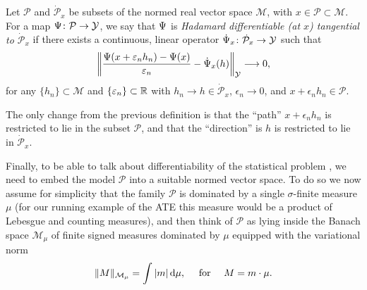 \documentclass[a4,danish]{article}
\begin{document}
\begin{definition}
  Let $\mathcal{P}$ and $\dot{\mathcal{P}}_x$ be subsets of the normed real vector space
  $\mathcal{M}$, with $x \in \mathcal{P} \subset \mathcal{M}$. For a map
  $\operatorname{\Psi} \colon \mathcal{P} \rightarrow \mathcal{Y}$, we say that $\operatorname{\Psi}$ is \textit{Hadamard
    differentiable (at $x$) tangential to $\dot{\mathcal{P}}_x$} if there exists a continuous,
  linear operator $\dot{\operatorname{\Psi}}_x \colon \dot{\mathcal{P}}_x \rightarrow \mathcal{Y}$ such that
  \begin{equation*}
    \left\Vert
      \frac{\operatorname{\Psi}(x + \varepsilon_n h_n) - \operatorname{\Psi}(x)}{\varepsilon_n} - \dot{\operatorname{\Psi}}_x(h)
    \right\Vert_{\mathcal{Y}} \longrightarrow 0, 
  \end{equation*}
  for any $\{h_n\} \subset \mathcal{M}$ and $\{\varepsilon_n\} \subset \mathbb{R}$ with
  $h_n \rightarrow h \in \dot{\mathcal{P}}_x$, $\epsilon_n\rightarrow 0$, and
  $x + \epsilon_n h_n \in \mathcal{P}$.
\end{definition}

The only change from the previous definition is that the ``path'' $x + \epsilon_n h_n$ is restricted
to lie in the subset $\mathcal{P}$, and that the ``direction'' is $h$ is restricted to lie in
$\dot{\mathcal{P}}_x$.

Finally, to be able to talk about differentiability of the statistical
problem , we need
to embed the model $\mathcal{P}$ into a suitable normed vector
space. To do so we now assume for simplicity that the family
$\mathcal{P}$ is dominated by a single $\sigma$-finite measure $\mu$
(for our running example of the ATE this measure would be a product of
Lebesgue and counting measures), and then think of $\mathcal{P}$ as
lying inside the Banach space $\mathcal{M}_{\mu}$ of finite signed
measures dominated by $\mu$ equipped with the variational norm
\begin{equation*}
  \Vert M \Vert_{\mathcal{M}_{\mu}} = \int |m |\mathop{}\!\mathrm{d} \mu, \quad \text{ for } \quad M = m \cdot \mu.
\end{equation*}
\end{document}
